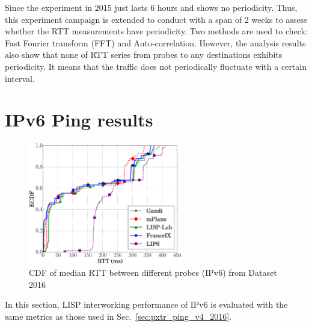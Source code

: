 Since the experiment in 2015 just lasts 6 hours and shows no periodicity. Thus, this experiment campaign is extended to conduct with a span of 2 weeks to assess whether the RTT measurements have periodicity. Two methods are used to check: Fast Fourier transform (FFT) and Auto-correlation. However, the analysis results also show that none of RTT series from probes to any destinations exhibits periodicity. It means that the traffic does not periodically fluctuate with a certain interval.


\section{IPv6 Ping results}
\label{sec:pxtr_ping_v6}
\begin{figure}[!t]
	\centering
	\includegraphics[width=0.6\textwidth]{Pics/v6/CDF_avg(RTT)_median_4_20.eps}
	\caption{CDF of median RTT between different probes (IPv6) from Dataset 2016}
	\label{CDF_of_median_RTT_between_different_probes_v6_2016}
\end{figure}

In this section, LISP interworking performance of IPv6 is evaluated with the same metrics as those used in Sec.~\ref{sec:pxtr_ping_v4_2016}.


